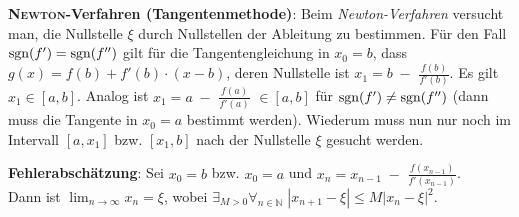\linie

\textbf{\textsc{Newton}-Verfahren (Tangentenmethode)}:
Beim \emph{Newton-Verfahren} versucht man, die Nullstelle $\xi$
durch Nullstellen der Ableitung zu bestimmen.
Für den Fall $\operatorname{sgn}(f') = \operatorname{sgn}(f'')$ gilt für die Tangentengleichung in
$x_0 = b$, dass $g(x) = f(b) + f'(b) \cdot (x - b)$, deren Nullstelle ist
$x_1 = b \;-$ {\large $\frac{f(b)}{f'(b)}$}.
Es gilt $x_1 \in [a,b]$.
Analog ist $x_1 = a \;-$ {\large $\frac{f(a)}{f'(a)}$} $\in [a,b]$ für
$\operatorname{sgn}(f') \not= \operatorname{sgn}(f'')$ (dann muss die Tangente in $x_0 = a$ bestimmt
werden).
Wiederum muss nun nur noch im Intervall $[a,x_1]$ bzw.
$[x_1,b]$ nach der Nullstelle $\xi$ gesucht werden.

\textbf{Fehlerabschätzung}:
Sei $x_0 = b$ bzw. $x_0 = a$ und
$x_n = x_{n-1} \;-$ {\large $\frac{f(x_{n-1})}{f'(x_{n-1})}$}. \\
Dann ist $\lim_{n \to \infty} x_n = \xi$, wobei
$\exists_{M > 0} \forall_{n \in \mathbb{N}}\;
|x_{n+1} - \xi| \le M |x_n - \xi|^2$.

\pagebreak

